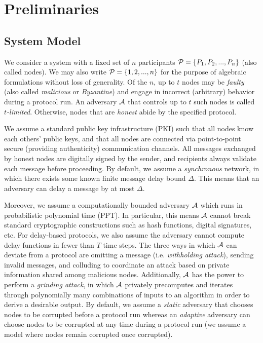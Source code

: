 
\section{Preliminaries}
\label{section:preliminaries}
\subsection{System Model}
We consider a system with a fixed set of $n$ participants $\mathcal{P} = \{P_1, P_2, ..., P_n\}$ (also called nodes).
We may also write $\mathcal{P} = \{1, 2, ..., n\}$ for the purpose of algebraic formulations without loss of generality.
Of the $n$, up to $t$ nodes may be \emph{faulty} (also called \textit{malicious} or \textit{Byzantine}) and engage in incorrect (arbitrary) behavior during a protocol run. An adversary $\mathcal{A}$ that controls up to $t$ such nodes is called \textit{$t$-limited}. Otherwise, nodes that are \textit{honest} abide by the specified protocol.

We assume a standard public key infrastructure (PKI) such that all nodes know each others' public keys, and that all nodes are connected via point-to-point secure (providing authenticity) communication channels. All messages exchanged by honest nodes are digitally signed by the sender, and recipients always validate each message before proceeding. By default, we assume a \textit{synchronous} network, in which there exists some known finite message delay bound $\Delta$. This means that an adversary can delay a message by at most $\Delta$.

Moreover, we assume a computationally bounded adversary $\mathcal{A}$ which runs in probabilistic polynomial time (PPT). In particular, this means $\mathcal{A}$ cannot break standard cryptographic constructions such as hash functions, digital signatures, etc.
For delay-based protocols, we also assume the adversary cannot compute delay functions in fewer than $T$ time steps.
The three ways in which $\mathcal{A}$ can deviate from a protocol are omitting a message (i.e. \textit{withholding attack}), sending invalid messages, and colluding to coordinate an attack based on private information shared among malicious nodes. Additionally, $\mathcal{A}$ has the power to perform a \textit{grinding attack}, in which $\mathcal{A}$ privately precomputes and iterates through polynomially many combinations of inputs to an algorithm in order to derive a desirable output. By default, we assume a \textit{static} adversary that chooses nodes to be corrupted before a protocol run whereas an \textit{adaptive} adversary can choose nodes to be corrupted at any time during a protocol run (we assume a model where nodes remain corrupted once corrupted).

